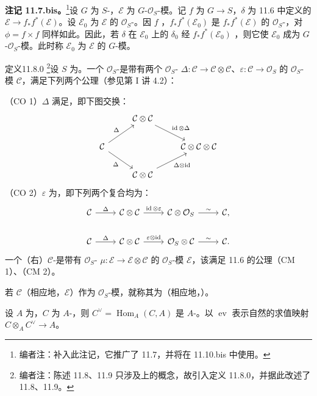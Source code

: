 \textbf{注记 11.7.bis。}\footnote{编者注：补入此注记，它推广了 11.7，并将在 11.10.bis 中使用。}设 $G$ 为 $S$-，$\mathcal E$ 为 $G$-$\mathcal O_S$-模。记 $f$ 为 $G\to S$，$\delta$ 为 11.6 中定义的 $\mathcal E\to f_*f^*(\mathcal E)$。设 $\mathcal E_0$ 为 $\mathcal E$ 的 $\mathcal O_S$-。因 $f$ ，$f_*f^*(\mathcal E_0)$ 是 $f_*f^*(\mathcal E)$ 的 $\mathcal O_S$-，对 $\phi=f\times f$ 同样如此。因此，若 $\delta$ 在 $\mathcal E_0$ 上的 $\delta_0$ 经 $f_*f^*(\mathcal E_0)$ ，则它使 $\mathcal E_0$ 成为 $G$-$\mathcal O_S$-模。此时称 $\mathcal E_0$ 为 $\mathcal E$ 的 $G$-模。

\begin{SGAresult}{定义}{11.8.0}
\footnote{编者注：陈述 11.8、11.9 只涉及上的概念，故引入定义 11.8.0，并据此改述了 11.8、11.9。}设 $S$ 为。一个 $\mathcal O_S$-是带有两个 $\mathcal O_S$- $\Delta:\mathcal C\to\mathcal C\otimes\mathcal C$、$\varepsilon:\mathcal C\to\mathcal O_S$ 的 $\mathcal O_S$-模 $\mathcal C$，满足下列两个公理（参见第 I 讲 4.2）：

（CO 1）$\Delta$ 满足，即下图交换：
\[
\begin{tikzcd}
&\mathcal C\otimes\mathcal C\arrow[dr,"\operatorname{id}\otimes\Delta"]&\\
\mathcal C\arrow[ur,"\Delta"]\arrow[dr,"\Delta"']&&\mathcal C\otimes\mathcal C\otimes\mathcal C\\
&\mathcal C\otimes\mathcal C\arrow[ur,"\Delta\otimes\operatorname{id}"']&
\end{tikzcd}
\]
（CO 2）$\varepsilon$ 为，即下列两个复合均为：
\[
\begin{tikzcd}
\mathcal C\arrow[r,"\Delta"]&\mathcal C\otimes\mathcal C\arrow[r,"\operatorname{id}\otimes\varepsilon"]&\mathcal C\otimes\mathcal O_S\arrow[r,"\sim"]&\mathcal C,\\
\mathcal C\arrow[r,"\Delta"]&\mathcal C\otimes\mathcal C\arrow[r,"\varepsilon\otimes\operatorname{id}"]&\mathcal O_S\otimes\mathcal C\arrow[r,"\sim"]&\mathcal C.
\end{tikzcd}
\]
一个（右）$\mathcal C$-是带有 $\mathcal O_S$- $\mu:\mathcal E\to\mathcal E\otimes\mathcal C$ 的 $\mathcal O_S$-模 $\mathcal E$，该满足 11.6 的公理（CM 1）、（CM 2）。

若 $\mathcal C$（相应地，$\mathcal E$）作为 $\mathcal O_S$-模，就称其为（相应地，）。
\end{SGAresult}
设 $A$ 为，$C$ 为 $A$-，则 $C^\vee=\operatorname{Hom}_A(C,A)$ 是 $A$-。以 $\operatorname{ev}$ 表示自然的求值映射 $C\otimes_A C^\vee\to A$。

